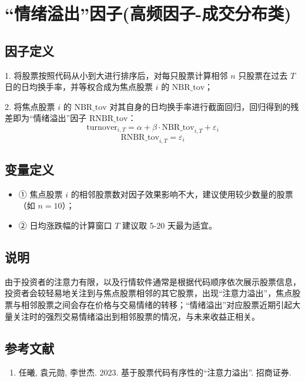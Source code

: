 \documentclass{article}
\begin{document}
\section{“情绪溢出”因子(高频因子-成交分布类)}

\subsection{因子定义}

1. 将股票按照代码从小到大进行排序后，对每只股票计算相邻 \( n \) 只股票在过去 \( T \) 日的日均换手率，并等权合成为焦点股票 \( i \) 的 \( \mathrm{NBR\_tov} \)；

2. 将焦点股票 \( i \) 的 \( \mathrm{NBR\_tov} \) 对其自身的日均换手率进行截面回归，回归得到的残差即为“情绪溢出”因子 \( \mathrm{RNBR\_tov} \)：
\begin{equation}
    \mathrm{turnover}_{i,T} = \alpha + \beta \cdot \mathrm{NBR\_tov}_{i,T} + \varepsilon_i
\end{equation}
\begin{equation}
    \mathrm{RNBR\_tov}_{i,T} = \varepsilon_i
\end{equation}

\subsection{变量定义}
\begin{itemize}
    \item ① 焦点股票 \( i \) 的相邻股票数对因子效果影响不大，建议使用较少数量的股票（如 \( n=10 \)）；
    \item ② 日均涨跌幅的计算窗口 \( T \) 建议取 5-20 天最为适宜。
\end{itemize}

\subsection{说明}
由于投资者的注意力有限，以及行情软件通常是根据代码顺序依次展示股票信息，投资者会较轻易地关注到与焦点股票相邻的其它股票，出现“注意力溢出”，焦点股票与相邻股票之间会存在价格与交易情绪的转移；“情绪溢出”对应股票近期引起大量关注时的强烈交易情绪溢出到相邻股票的情况，与未来收益正相关。

\subsection{参考文献}
\begin{enumerate}
    \item 任曦, 袁元勋, 李世杰. 2023. 基于股票代码有序性的“注意力溢出”. 招商证券.
\end{enumerate}
\end{document}

